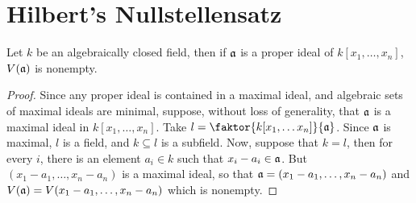\section{Hilbert's Nullstellensatz}

\begin{theorem}\label{theorem_1.7.1}
    Let $k$ be an algebraically closed field, then if $\mathfrak{a}$ is a proper ideal of
     $k[x_1, \dots, x_n]$, $V(\mathfrak{a})$ is nonempty.
\end{theorem}
\begin{proof}
    Since any proper ideal is contained in a maximal ideal, and algebraic sets
    of maximal ideals are minimal, suppose, without loss of generality, that
    $\mathfrak{a}$ is a maximal ideal in $k[x_1, \dots, x_n]$. Take $l=\faktor{k[x_1,
    \dots x_n]}{\af}$. Since $\mathfrak{a}$ is maximal, $l$ is a field, and $k \subseteq
    l$ is a subfield. Now, suppose that $k=l$, then for every  $i$, there is an
    element  $a_i \in k$ such that $x_i-a_i \in \mathfrak{a}$. But $(x_1-a_1, \dots,
    x_n-a_n)$ is a maximal ideal, so that $\mathfrak{a}=(x_1-a_1, \dots, x_n-a_n)$ and
    $V(\mathfrak{a})=V(x_1-a_1, \dots, x_n-a_n)$ which is nonempty.
\end{proof}

